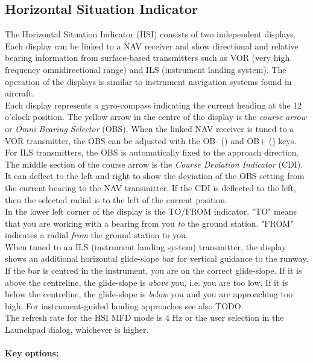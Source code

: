 \documentclass[Orbiter User Manual.tex]{subfiles}
\begin{document}
\subsection{Horizontal Situation Indicator}
The Horizontal Situation Indicator (HSI) consists of two independent displays. Each display can be linked to a NAV receiver and show directional and relative bearing information from surface-based transmitters such as VOR (very high frequency omnidirectional range) and ILS (instrument landing system). The operation of the displays is similar to instrument navigation systems found in aircraft.\\
Each display represents a gyro-compass indicating the current heading at the 12 o'clock position. The yellow arrow in the centre of the display is the \textit{course arrow} or \textit{Omni Bearing Selector} (OBS). When the linked NAV receiver is tuned to a VOR transmitter, the OBS can be adjusted with the OB- (\Shift\keystroke{[}) and OB+ (\Shift\keystroke{]}) keys. For ILS transmitters, the OBS is automatically fixed to the approach direction.\\
The middle section of the course arrow is the \textit{Course Deviation Indicator} (CDI). It can deflect to the left and right to show the deviation of the OBS setting from the current bearing to the NAV transmitter. If the CDI is deflected to the left, then the selected radial is to the left of the current position.\\
In the lower left corner of the display is the TO/FROM indicator. "TO" means that you are working with a bearing from you \textit{to} the ground station. "FROM" indicates a radial \textit{from} the ground station to you.\\
When tuned to an ILS (instrument landing system) transmitter, the display shows an additional horizontal glide-slope bar for vertical guidance to the runway. If the bar is centred in the instrument, you are on the correct glide-slope. If it is above the centreline, the glide-slope is \textit{above} you, i.e. you are too low. If it is below the centreline, the glide-slope is \textit{below} you and you are approaching too high. For instrument-guided landing approaches see also TODO.\\
The refresh rate for the HSI MFD mode is 4 Hz or the user selection in the Launchpad dialog, whichever is higher.\\
\\
\textbf{Key options:}
\end{document}

